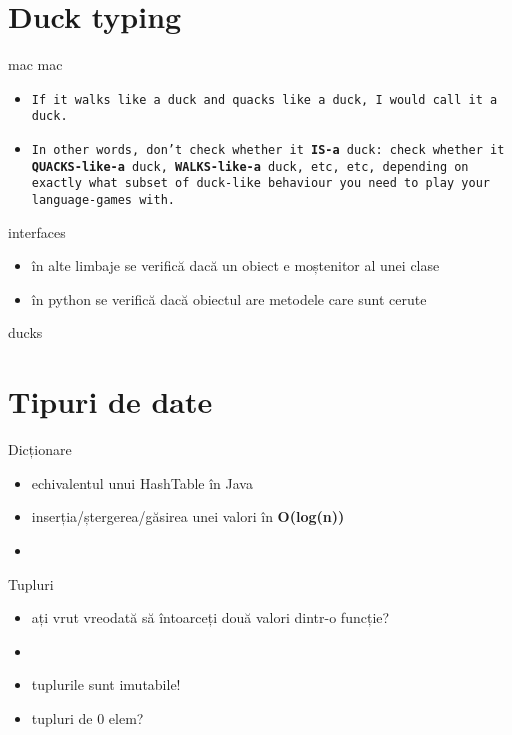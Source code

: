 \documentclass{beamer}
\begin{document}
\section{Duck typing}
\frame{\tableofcontents[currentsection]}


\begin{frame}{mac mac}
  \begin{itemize}
  \item \texttt{If it walks like a duck and quacks like a duck, I would call it a duck.}
  \item \texttt{In other words, don't check whether it \textbf{IS-a} duck: check whether it \textbf{QUACKS-like-a} duck, \textbf{WALKS-like-a} duck, etc, etc, depending on exactly what subset of duck-like behaviour you need to play your language-games with.}
  \end{itemize}
\end{frame}

\begin{frame}{interfaces}
  \begin{itemize}
  \item în alte limbaje se verifică dacă un obiect e moștenitor al unei clase
  \item în python se verifică dacă obiectul are metodele care sunt cerute
  \end{itemize}
\end{frame}

\begin{frame}{ducks}
  \tiny 
\end{frame}

\section{Tipuri de date}
\frame{\tableofcontents[currentsection]}



\begin{frame}{Dicționare}
  \begin{itemize}
  \item echivalentul unui HashTable în Java
  \item inserția/ștergerea/găsirea unei valori în \textbf{O(log(n))}
  \item \small 
  \end{itemize}
\end{frame}



\begin{frame}{Tupluri}
  \begin{itemize}
  \item ați vrut vreodată să întoarceți două valori dintr-o funcție?
  \item  \small 
  \item tuplurile sunt imutabile!
  \item tupluri de 0 elem?
  \end{itemize}
\end{frame}
\end{document}
